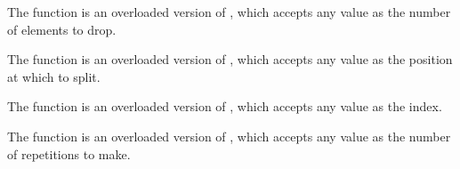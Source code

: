\begin{haddockdesc}
\item[\begin{tabular}{@{}l}
genericDrop :: Integral i => i -> {\char 91}a{\char 93} -> {\char 91}a{\char 93}
\end{tabular}]
{\haddockbegindoc
The  function is an overloaded version of , which
 accepts any  value as the number of elements to drop.\par}
\end{haddockdesc}
\begin{haddockdesc}
\item[\begin{tabular}{@{}l}
genericSplitAt :: Integral i => i -> {\char 91}a{\char 93} -> ({\char 91}a{\char 93}, {\char 91}a{\char 93})
\end{tabular}]
{\haddockbegindoc
The  function is an overloaded version of , which
 accepts any  value as the position at which to split.\par}
\end{haddockdesc}
\begin{haddockdesc}
\item[\begin{tabular}{@{}l}
genericIndex :: Integral i => {\char 91}a{\char 93} -> i -> a
\end{tabular}]
{\haddockbegindoc
The  function is an overloaded version of \haddockid{!!}, which
 accepts any  value as the index.\par}
\end{haddockdesc}
\begin{haddockdesc}
\item[\begin{tabular}{@{}l}
genericReplicate :: Integral i => i -> a -> {\char 91}a{\char 93}
\end{tabular}]
{\haddockbegindoc
The  function is an overloaded version of ,
 which accepts any  value as the number of repetitions to make.\par}
\end{haddockdesc}